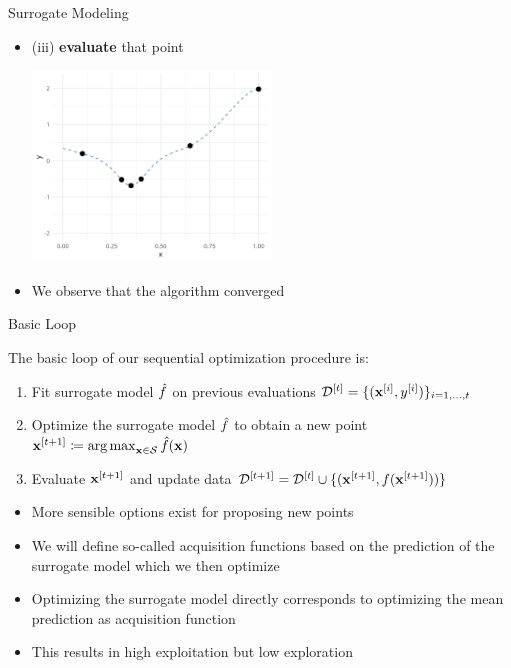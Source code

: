 \documentclass[11pt,compress,t,notes=noshow, xcolor=table]{beamer}
\begin{document}
\begin{vbframe}{Surrogate Modeling}
\begin{itemize}
\framebreak

\item (iii) \textbf{evaluate} that point
\vspace{+.45cm}

\begin{center}
  \includegraphics[width = 0.5\textwidth]{figure_man/loop_10.png}
\end{center}

\item We observe that the algorithm converged

\end{itemize}

\end{vbframe}

\begin{vbframe}{Basic Loop}

The basic loop of our sequential optimization procedure is:
  \begin{enumerate}
    \item Fit surrogate model $\hat{f}$ on previous evaluations $\mathcal{D}^{[t]} = \{(\mathbf{x}^{[i]}, y^{[i]})\}_{i = 1, \ldots, t}$
    \item Optimize the surrogate model $\hat{f}$ to obtain a new point $\mathbf{x}^{[t+1]} \coloneqq \operatorname{arg\,max}_{\mathbf{x} \in \mathcal{S}} \hat{f}(\mathbf{x})$
    \item Evaluate $\mathbf{x}^{[t+1]}$ and update data $\mathcal{D}^{[t+1]} = \mathcal{D}^{[t]} \cup \{(\mathbf{x}^{[t+1]}, f(\mathbf{x}^{[t+1]}))\}$
  \end{enumerate}

\framebreak

\begin{itemize}
  \item More sensible options exist for proposing new points
  \item We will define so-called acquisition functions based on the prediction of the surrogate model which we then optimize
  \item Optimizing the surrogate model directly corresponds to optimizing the mean prediction as acquisition function
  \item This results in high exploitation but low exploration
\end{itemize}

\end{vbframe}
\end{document}
